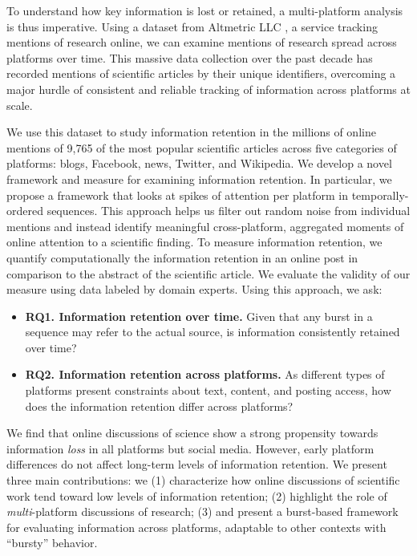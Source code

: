 \documentclass[letterpaper]{article} %
\begin{document}
To understand how key information is lost or retained, a multi-platform analysis is thus imperative. %
Using a dataset from Altmetric LLC \citep{altmetricsupportOurDataOur2021}, a service tracking mentions of research online, we can examine mentions of research spread across platforms over time. This massive data collection over the past decade has recorded mentions of scientific articles by their unique identifiers, overcoming a major hurdle of consistent and reliable tracking of information across platforms at scale. %

We use this dataset to study information retention in the millions of online mentions of 9,765 of the most popular scientific articles across five categories of platforms: blogs, Facebook, news, Twitter, and Wikipedia. We develop a novel framework and measure for examining information retention. 
In particular, we propose a framework that looks at spikes of attention \cite[aka bursts, see][]{Kleinberg2003,barabasiOriginBurstsHeavy2005,chengCascadesRecur2016} per platform in temporally-ordered sequences. This approach helps us filter out random noise from individual mentions and instead identify meaningful cross-platform, aggregated moments of online attention to a scientific finding.
To measure information retention, we quantify computationally the information retention in an online post in comparison to the abstract of the scientific article. We evaluate the validity of our measure using data labeled by domain experts.
Using this approach, we ask:

\begin{itemize}
    \item %
    \textbf{RQ1. Information retention over time.} Given that any burst in a sequence may refer to the actual source, is information consistently retained over time?
    \item %
    \textbf{RQ2. Information retention across platforms.} As different types of platforms present constraints about text, content, and posting access, how does the information retention differ across platforms?
\end{itemize}

We find that online discussions of science show a strong propensity towards information \textit{loss} in all platforms but social media. However, early platform differences do not affect long-term levels of information retention.
We present three main contributions: we (1) characterize how online discussions of scientific work tend toward low levels of information retention; (2) highlight the role of \textit{multi}-platform discussions of research; (3) and present a burst-based framework for evaluating information across platforms, adaptable to other contexts with ``bursty'' behavior.
\end{document}
